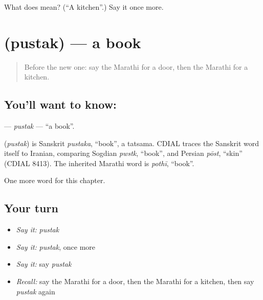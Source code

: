 \begin{tcolorbox}[breakable,colback=teal!4,colframe=teal!35!black,title={Before you move on}]
What does  mean? (\textquotedblleft{}A kitchen\textquotedblright{}.) Say it once more.
\end{tcolorbox}
\section[\texorpdfstring{\mr{पुस्तक} (pustak)}{पुस्तक (pustak)}]{ (pustak) — a book}

\label{lesson:MR-C93-pustak}



\begin{quote}
Before the new one: say the Marathi for a door, then the Marathi for a kitchen.
\end{quote}

\subsection*{You'll want to know: }
\textbf{} — \emph{pustak} — \textquotedblleft{}a book\textquotedblright{}.

\begin{cousinweb}
\textbf{} (\emph{pustak}) is Sanskrit \emph{pustaka}, \textquotedblleft{}book\textquotedblright{}, a tatsama. CDIAL traces the Sanskrit word itself to Iranian, comparing Sogdian \emph{pwstk}, \textquotedblleft{}book\textquotedblright{}, and Persian \emph{pōst}, \textquotedblleft{}skin\textquotedblright{} (CDIAL 8413). The inherited Marathi word is \emph{pothī}, \textquotedblleft{}book\textquotedblright{}.
\end{cousinweb}

\begin{grammarlens}[title={What you've built}]
One more word for this chapter.
\end{grammarlens}

\subsection*{Your turn}
\begin{itemize}
\raggedright
  \item \emph{Say it:} \emph{pustak}
  \item \emph{Say it:} \emph{pustak}, once more
  \item \emph{Say it:} say \emph{pustak}
  \item \emph{Recall:} say the Marathi for a door, then the Marathi for a kitchen, then say \emph{pustak} again
\end{itemize}

